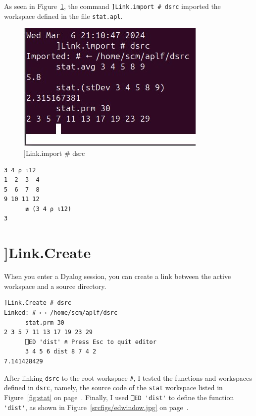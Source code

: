 \documentclass[a4paper,12pt]{book}
\begin{document}
As seen in Figure~\ref{fig:link-import}, the
command \verb|]Link.import # dsrc| imported
the workspace defined in the file \verb|stat.apl|.

\begin{figure}[!h]
\includegraphics{figs/link-import.jpg}
\caption{]Link.import \# dsrc}
\label{fig:link-import}
\end{figure}

\begin{lstlisting}[language=apl]
     3 4 ⍴ ⍳12
1  2  3  4
5  6  7  8
9 10 11 12
      ≢ (3 4 ⍴ ⍳12)
3
\end{lstlisting}

\section{]Link.Create}
  When you enter a Dyalog session,
  you can create a link between the active
  workspace and a source directory.
\begin{lstlisting}[language=apl]
      ]Link.Create # dsrc                                           
Linked: # ←→ /home/scm/aplf/dsrc                                    
      stat.prm 30                                                   
2 3 5 7 11 13 17 19 23 29                                           
      ⎕ED 'dist' ⍝ Press Esc to quit editor
      3 4 5 6 dist 8 7 4 2
7.141428429
\end{lstlisting}
After linking \verb|dsrc| to the root
workspace \verb|#|, I tested the functions
and workspaces defined in \verb|dsrc|, namely,
the source code of the \verb|stat| workspace
listed in Figure~\ref{fig:stat} on page~\pageref{fig:stat}.
Finally, I used \verb|⎕ED 'dist'| to define
the function \verb|'dist'|, as shown
in Figure~\ref{srcfigs/edwindow.jpg} on
page~\pageref{srcfigs/edwindow.jpg}.
\end{document}
